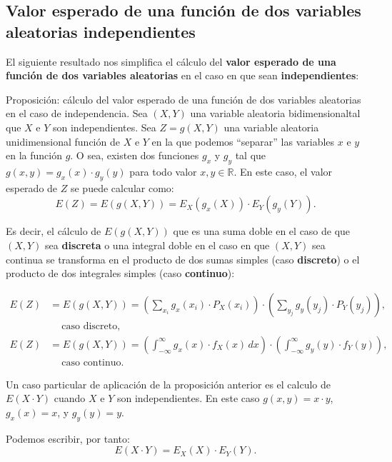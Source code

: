 \documentclass[]{book}
\begin{document}
\hypertarget{valor-esperado-de-una-funciuxf3n-de-dos-variables-aleatorias-independientes}{%
\subsection{Valor esperado de una función de dos variables aleatorias independientes}\label{valor-esperado-de-una-funciuxf3n-de-dos-variables-aleatorias-independientes}}

El siguiente resultado nos simplifica el cálculo del \textbf{valor esperado de una función de dos variables aleatorias} en el caso en que sean \textbf{independientes}:

Proposición: cálculo del valor esperado de una función de dos variables aleatorias en el caso de independencia.
Sea \((X,Y)\) una variable aleatoria bidimensionaltal que \(X\) e \(Y\) son independientes.
Sea \(Z=g(X,Y)\) una variable aleatoria unidimensional función de \(X\) e \(Y\) en la que podemos ``separar'' las variables \(x\) e \(y\) en la función \(g\). O sea, existen dos funciones \(g_x\) y \(g_y\) tal que \(g(x,y)=g_x(x)\cdot g_y(y)\) para todo valor \(x,y\in\mathbb{R}\). En este caso, el valor esperado de \(Z\) se puede calcular como:
\[
E(Z)=E(g(X,Y))=E_X(g_x(X))\cdot E_Y(g_y(Y)).
\]

Es decir, el cálculo de \(E(g(X,Y))\) que es una suma doble en el caso de que \((X,Y)\) sea \textbf{discreta} o una integral doble en el caso en que \((X,Y)\) sea continua se transforma en el producto de dos sumas simples (caso \textbf{discreto}) o el producto de dos integrales simples (caso \textbf{continuo}):

\[
\begin{array}{rl}
E(Z) & =E(g(X,Y))=\left(\sum_{x_i} g_x(x_i)\cdot P_X(x_i)\right)\cdot \left(\sum_{y_j} g_y(y_j)\cdot P_Y(y_j)\right),\\ &\ \quad \mbox{caso discreto},\\
E(Z) & =E(g(X,Y))=\left(\int_{-\infty}^\infty g_x(x)\cdot f_X(x)\, dx\right)\cdot \left(\int_{-\infty}^\infty g_y(y)\cdot f_Y(y)\right), \\  &\ \quad \mbox{caso continuo}.
\end{array}
\]

Un caso particular de aplicación de la proposición anterior es el calculo de \(E(X\cdot Y)\) cuando \(X\) e \(Y\) son independientes. En este caso \(g(x,y)=x\cdot y\), \(g_x(x)=x\), y \(g_y(y)=y\).

Podemos escribir, por tanto:
\[
E(X\cdot Y)=E_X(X)\cdot E_Y(Y).
\]
\end{document}
